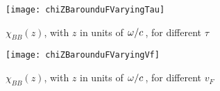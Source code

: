 \documentclass[11pt]{article}
\begin{document}
	\begin{figure}[htp]
		\centering
		\texttt{[image: chiZBarounduFVaryingTau]}
		\caption{$\chi_{BB}(z)$, with $z$ in units of $\flatfrac{\omega}{c}$, for different $\tau$} \label{fig:tau}
	\end{figure}

	\begin{figure}[htp]
		\centering
		\texttt{[image: chiZBarounduFVaryingVf]}
		\caption{$\chi_{BB}(z)$, with $z$ in units of $\flatfrac{\omega}{c}$, for different $v_F$} \label{fig:vf}
	\end{figure}

	\newpage
	\listoftodos
	\newpage
	\printbibliography
\end{document}
